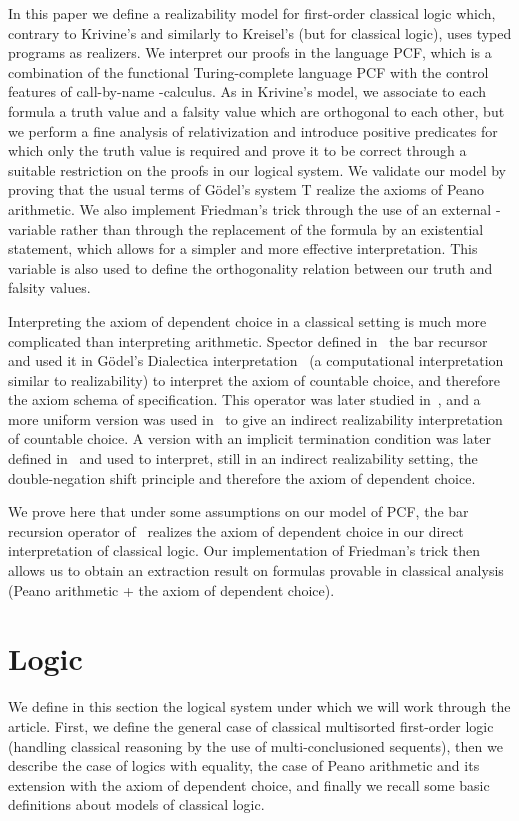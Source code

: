\documentclass{CSML}
\begin{document}
In this paper we define a realizability model for first-order classical logic which, contrary to Krivine's and similarly to Kreisel's (but for classical logic), uses typed programs as realizers. We interpret our proofs in the language PCF, which is a combination of the functional Turing-complete language PCF with the control features of call-by-name -calculus.  As in Krivine's model, we associate to each formula a truth value and a falsity value which are orthogonal to each other, but we perform a fine analysis of relativization and introduce positive predicates for which only the truth value is required and prove it to be correct through a suitable restriction on the proofs in our logical system. We validate our model by proving that the usual terms of G\"odel's system T realize the axioms of Peano arithmetic. We also implement Friedman's trick through the use of an external -variable rather than through the replacement of the  formula by an existential statement, which allows for a simpler and more effective interpretation. This variable is also used to define the orthogonality relation between our truth and falsity values.\par
Interpreting the axiom of dependent choice in a classical setting is much more complicated than interpreting arithmetic. Spector defined in~\cite{Spector} the bar recursor and used it in G\"odel's Dialectica interpretation~\cite{GodelDialectica} (a computational interpretation similar to realizability) to interpret the axiom of countable choice, and therefore the axiom schema of specification. This operator was later studied in~\cite{KohlenbachThesis}, and a more uniform version was used in~\cite{BerardiBezemCoquand} to give an indirect realizability interpretation of countable choice. A version with an implicit termination condition was later defined in~\cite{BergerOlivaChoice} and used to interpret, still in an indirect realizability setting, the double-negation shift principle and therefore the axiom of dependent choice.\par
We prove here that under some assumptions on our model of PCF, the bar recursion operator of~\cite{BergerOlivaChoice} realizes the axiom of dependent choice in our direct interpretation of classical logic. Our implementation of Friedman's trick then allows us to obtain an extraction result on  formulas provable in classical analysis (Peano arithmetic + the axiom of dependent choice).
\section{Logic}
\label{logic}
We define in this section the logical system under which we will work through the article. First, we define the general case of classical multisorted first-order logic (handling classical reasoning by the use of multi-conclusioned sequents), then we describe the case of logics with equality, the case of Peano arithmetic and its extension with the axiom of dependent choice, and finally we recall some basic definitions about models of classical logic.
\end{document}
